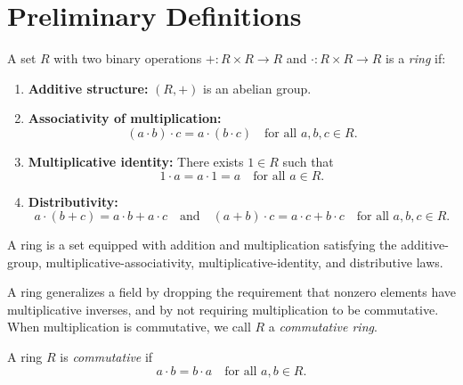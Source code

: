
\section{Preliminary Definitions}

\begin{definition}[Ring]
\label{def:algebraic-geometry-ring}
A set $R$ with two binary operations $+ : R \times R \to R$
and $\cdot : R \times R \to R$ is a \emph{ring} if:

\begin{enumerate}
\item \textbf{Additive structure:}
$(R, +)$ is an abelian group.

\item \textbf{Associativity of multiplication:}
\[
(a \cdot b) \cdot c = a \cdot (b \cdot c)
\quad \text{for all } a,b,c \in R.
\]

\item \textbf{Multiplicative identity:}
There exists $1 \in R$ such that
\[
1 \cdot a = a \cdot 1 = a
\quad \text{for all } a \in R.
\]

\item \textbf{Distributivity:}
\[
a \cdot (b + c) = a \cdot b + a \cdot c
\quad \text{and} \quad
(a + b) \cdot c = a \cdot c + b \cdot c
\quad \text{for all } a,b,c \in R.
\]
\end{enumerate}
\end{definition}

\begin{remark*}
A ring is a set equipped with addition and multiplication satisfying the
additive-group, multiplicative-associativity, multiplicative-identity, and
distributive laws.
\end{remark*}

\begin{remark*}[Interpretation]
A ring generalizes a field by dropping the requirement that
nonzero elements have multiplicative inverses,
and by not requiring multiplication to be commutative.
When multiplication is commutative, we call $R$ a
\emph{commutative ring}.
\end{remark*}

\begin{definition}
\label{def:algebraic-geometry-commutative-ring}
A ring $R$ is \emph{commutative} if
\[
a \cdot b = b \cdot a
\quad \text{for all } a, b \in R.
\]
\end{definition}

